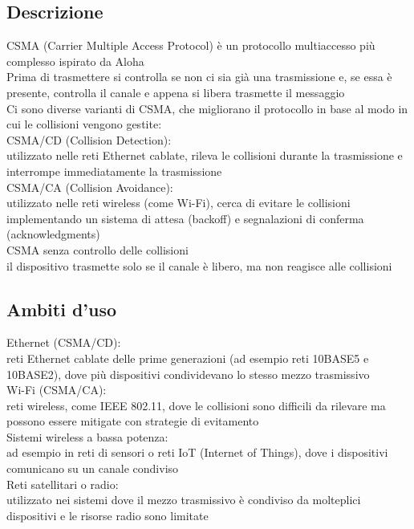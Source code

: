 \documentclass[10pt,oneside,a4paper]{article}
\begin{document}
\subsection{Descrizione}
CSMA (Carrier Multiple Access Protocol) è un protocollo multiaccesso più complesso ispirato da Aloha\\
Prima di trasmettere si controlla se non ci sia già una trasmissione e, se essa è presente, controlla il canale e appena si libera trasmette il messaggio\\
Ci sono diverse varianti di CSMA, che migliorano il protocollo in base al modo in cui le collisioni vengono gestite:\\
CSMA/CD (Collision Detection):\\
utilizzato nelle reti Ethernet cablate, rileva le collisioni durante la trasmissione e interrompe immediatamente la trasmissione\\
CSMA/CA (Collision Avoidance):\\
utilizzato nelle reti wireless (come Wi-Fi), cerca di evitare le collisioni implementando un sistema di attesa (backoff) e segnalazioni di conferma (acknowledgments)\\
CSMA senza controllo delle collisioni\\
il dispositivo trasmette solo se il canale è libero, ma non reagisce alle collisioni
\subsection{Ambiti d'uso}
Ethernet (CSMA/CD):\\
reti Ethernet cablate delle prime generazioni (ad esempio reti 10BASE5 e 10BASE2), dove più dispositivi condividevano lo stesso mezzo trasmissivo\\
Wi-Fi (CSMA/CA):\\
reti wireless, come IEEE 802.11, dove le collisioni sono difficili da rilevare ma possono essere mitigate con strategie di evitamento\\
Sistemi wireless a bassa potenza:\\
ad esempio in reti di sensori o reti IoT (Internet of Things), dove i dispositivi comunicano su un canale condiviso\\
Reti satellitari o radio:\\
utilizzato nei sistemi dove il mezzo trasmissivo è condiviso da molteplici dispositivi e le risorse radio sono limitate
\end{document}
